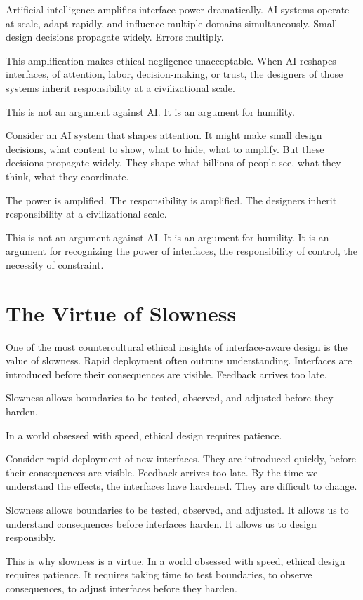\documentclass[
  openright]{book}
\begin{document}
Artificial intelligence amplifies interface power dramatically. AI
systems operate at scale, adapt rapidly, and influence multiple domains
simultaneously. Small design decisions propagate widely. Errors
multiply.

This amplification makes ethical negligence unacceptable. When AI
reshapes interfaces, of attention, labor, decision-making, or trust, the
designers of those systems inherit responsibility at a civilizational
scale.

This is not an argument against AI. It is an argument for humility.

Consider an AI system that shapes attention. It might make small design
decisions, what content to show, what to hide, what to amplify. But
these decisions propagate widely. They shape what billions of people
see, what they think, what they coordinate.

The power is amplified. The responsibility is amplified. The designers
inherit responsibility at a civilizational scale.

This is not an argument against AI. It is an argument for humility. It
is an argument for recognizing the power of interfaces, the
responsibility of control, the necessity of constraint.

\section{The Virtue of Slowness}\label{the-virtue-of-slowness}

One of the most countercultural ethical insights of interface-aware
design is the value of slowness. Rapid deployment often outruns
understanding. Interfaces are introduced before their consequences are
visible. Feedback arrives too late.

Slowness allows boundaries to be tested, observed, and adjusted before
they harden.

In a world obsessed with speed, ethical design requires patience.

Consider rapid deployment of new interfaces. They are introduced
quickly, before their consequences are visible. Feedback arrives too
late. By the time we understand the effects, the interfaces have
hardened. They are difficult to change.

Slowness allows boundaries to be tested, observed, and adjusted. It
allows us to understand consequences before interfaces harden. It allows
us to design responsibly.

This is why slowness is a virtue. In a world obsessed with speed,
ethical design requires patience. It requires taking time to test
boundaries, to observe consequences, to adjust interfaces before they
harden.
\end{document}
